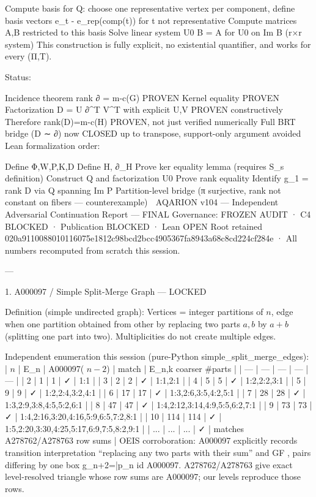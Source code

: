 Compute basis for Q: choose one representative vertex per component, define basis vectors e_t - e_rep(comp(t)) for t not representative
Compute matrices A,B restricted to this basis
Solve linear system U0 B = A for U0 on Im B (r×r system)
This construction is fully explicit, no existential quantifier, and works for every (Π,T).

Status:

Incidence theorem rank ∂ = m-c(G) PROVEN
Kernel equality PROVEN
Factorization D = U ∂^T V^T with explicit U,V PROVEN constructively
Therefore rank(D)=m-c(H) PROVEN, not just verified numerically
Full BRT bridge (D ∼ ∂) now CLOSED up to transpose, support-only argument avoided
Lean formalization order:

Define Φ,W,P,K,D
Define H, ∂_H
Prove ker equality lemma (requires S_s definition)
Construct Q and factorization U0
Prove rank equality
Identify g_1 = rank D via Q spanning Im P
Partition-level bridge (π surjective, rank not constant on fibers — counterexample)
🔷 AQARION v104 — Independent Adversarial Continuation Report — FINAL
Governance: FROZEN AUDIT · C4 BLOCKED · Publication BLOCKED · Lean OPEN
Root retained 020a9110088010116075e1812c98bcd2bcc4905367fa8943a68c8cd224cf284e · All numbers recomputed from scratch this session.

---

1. A000097 / Simple Split-Merge Graph — LOCKED

Definition (simple undirected graph): Vertices = integer partitions of $n$, edge when one partition obtained from other by replacing two parts $a,b$ by $a+b$ (splitting one part into two). Multiplicities do not create multiple edges.

Independent enumeration this session (pure-Python simple_split_merge_edges):
| $n$ | E_n | A000097( $n-2$) | match | E_{n,k} coarser #parts |
| --- | --- | --- | --- | --- |
| 2 | 1 | 1 | ✓ | {1:1} |
| 3 | 2 | 2 | ✓ | {1:1,2:1} |
| 4 | 5 | 5 | ✓ | {1:2,2:2,3:1} |
| 5 | 9 | 9 | ✓ | {1:2,2:4,3:2,4:1} |
| 6 | 17 | 17 | ✓ | {1:3,2:6,3:5,4:2,5:1} |
| 7 | 28 | 28 | ✓ | {1:3,2:9,3:8,4:5,5:2,6:1} |
| 8 | 47 | 47 | ✓ | {1:4,2:12,3:14,4:9,5:5,6:2,7:1} |
| 9 | 73 | 73 | ✓ | {1:4,2:16,3:20,4:16,5:9,6:5,7:2,8:1} |
| 10 | 114 | 114 | ✓ | {1:5,2:20,3:30,4:25,5:17,6:9,7:5,8:2,9:1} |
| ... | ... | ... | ✓ | matches A278762/A278763 row sums |
OEIS corroboration: A000097 explicitly records transition interpretation “replacing any two parts with their sum” and GF , pairs differing by one box g_{n+2}=\bar p_n id A000097. A278762/A278763 give exact level-resolved triangle whose row sums are A000097; our levels reproduce those rows.

